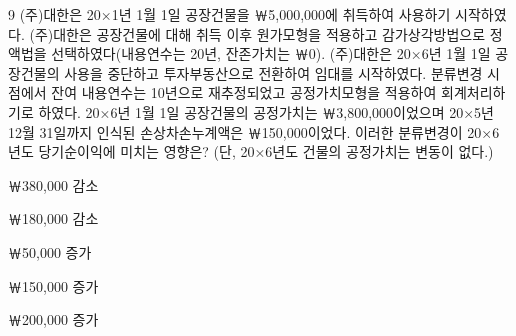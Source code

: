 \begin{question}{9}
(주)대한은 20×1년 1월 1일 공장건물을 ￦5,000,000에 취득하여 사용하기 시작하였다. (주)대한은 공장건물에 대해 취득 이후 원가모형을 적용하고 감가상각방법으로 정액법을 선택하였다(내용연수는 20년, 잔존가치는 ￦0). (주)대한은 20×6년 1월 1일 공장건물의 사용을 중단하고 투자부동산으로 전환하여 임대를 시작하였다. 분류변경 시점에서 잔여 내용연수는 10년으로 재추정되었고 공정가치모형을 적용하여 회계처리하기로 하였다. 20×6년 1월 1일 공장건물의 공정가치는 ￦3,800,000이었으며 20×5년 12월 31일까지 인식된 손상차손누계액은 ￦150,000이었다. 이러한 분류변경이 20×6년도 당기순이익에 미치는 영향은? (단, 20×6년도 건물의 공정가치는 변동이 없다.)
\begin{choices}
  \item ￦380,000 감소
  \item ￦180,000 감소
  \item ￦50,000 증가
  \item ￦150,000 증가
  \item ￦200,000 증가
\end{choices}
\end{question}
\answerall
{}
